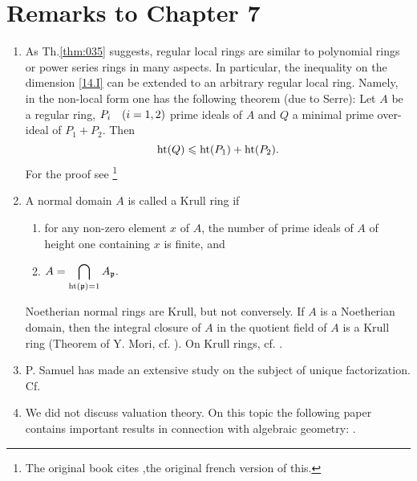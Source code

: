 \documentclass[../main]{subfiles}
\begin{document}
\section*{Remarks to Chapter 7}
\begin{enumerate}[label=\arabic*]
    \item As Th.\ref{thm:035} suggests, regular local rings are similar to polynomial rings or power series rings in many aspects. In particular, the inequality on the dimension \ref{14.I} can be extended to an arbitrary regular local ring. Namely, in the non-local form one has the following theorem (due to Serre): Let $A$ be a regular ring, $P_{i}\for{i=1,2}$ prime ideals of $A$ and $Q$ a minimal prime over-ideal of $P_{1}+P_{2}$. Then
    \[\operatorname{ht}(Q)\leqslant \operatorname{ht}(P_1) +\operatorname{ht}(P_2).\]
    For the proof see \cite[Ch.V, p.18.]{serre2000local}\footnote{The original book cites \cite{serre2009algèbre},the original french version of this.} 
    \item A normal domain $A$ is called a Krull ring if \begin{enumerate}[label=(\arabic*)]
        \item for any non-zero element $x$ of $A$, the number of prime ideals of $A$ of height one containing $x$ is finite, and
        \item $A= \displaystyle\bigcap_{\operatorname{ht}(\mathfrak{p})=1} A_{\mathfrak{p}}.$
    \end{enumerate}
    Noetherian normal rings are Krull, but not conversely. If $A$ is a Noetherian domain, then the integral closure of $A$ in the quotient field of $A$ is a Krull ring (Theorem of Y. Mori, cf. \cite{nagata1975local}). On Krull rings, cf. \cite{bourbaki1998commutative}.
    \item P. Samuel has made an extensive study on the subject of unique factorization. Cf.\cite{samuel1964lectures}
    \item We did not discuss valuation theory. On this topic the following paper contains important results in connection with algebraic geometry: \cite{abhyankar1956on}.
\end{enumerate}
\end{document}

